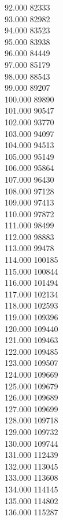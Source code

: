 { 92.000	82333 \\
 93.000	82982 \\
 94.000	83523 \\
 95.000	83938 \\
 96.000	84449 \\
 97.000	85179 \\
 98.000	88543 \\
 99.000	89207 \\
 100.000	89890 \\
 101.000	90547 \\
 102.000	93770 \\
 103.000	94097 \\
 104.000	94513 \\
 105.000	95149 \\
 106.000	95864 \\
 107.000	96430 \\
 108.000	97128 \\
 109.000	97413 \\
 110.000	97872 \\
 111.000	98499 \\
 112.000	98883 \\
 113.000	99478 \\
 114.000	100185 \\
 115.000	100844 \\
 116.000	101494 \\
 117.000	102134 \\
 118.000	102593 \\
 119.000	109396 \\
 120.000	109440 \\
 121.000	109463 \\
 122.000	109485 \\
 123.000	109507 \\
 124.000	109669 \\
 125.000	109679 \\
 126.000	109689 \\
 127.000	109699 \\
 128.000	109718 \\
 129.000	109732 \\
 130.000	109744 \\
 131.000	112439 \\
 132.000	113045 \\
 133.000	113608 \\
 134.000	114145 \\
 135.000	114802 \\
 136.000	115287 \\
}

